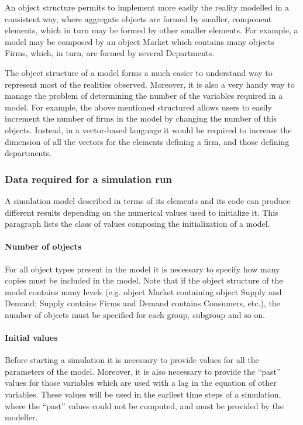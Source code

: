 \documentclass [11pt,a4paper] {book}
\begin{document}
An object structure permits to implement more easily the reality modelled in a consistent way,
where aggregate objects are formed by smaller, component elements, which in turn may be
formed by other smaller elements. For example, a model may be composed by an object
Market which contains many objects Firms, which, in turn, are formed by several
Departments.

The object structure of a model forms a much easier to understand way to represent most
of the realities observed. Moreover, it is also a very handy way to manage the problem of
determining the number of the variables required in a model. For example, the above
mentioned structured allows users to easily increment the number of firms in the model by changing the number of this objects. Instead, in a vector-based language it would be required to increase the dimension of all the vectors for the elements defining a firm, and those defining departments.


\subsubsection{Data required for a simulation run}

A simulation model described in terms of its elements and its code can produce different results depending on the numerical values used to initialize it. This paragraph lists the class of values composing the initialization of a model.

\paragraph{Number of objects} For all object types present in the model it is
necessary to specify how many copies must be included in the model. Note that if the
object structure of the model contains many levels (e.g. object Market containing object Supply and Demand; Supply contains Firms and Demand contains Consumers, etc.), the number of objects must be specified for each group,
subgroup and so on.


\paragraph{Initial values} Before starting a simulation it is necessary to provide
values for all the parameters of the model. Moreover, it is also necessary to provide the
``past'' values for those variables which are used with a lag in the equation of other
variables. These values will be used in the earliest time steps of a simulation, where the ``past'' values could not be computed, and must be provided by the modeller. 
\end{document}
